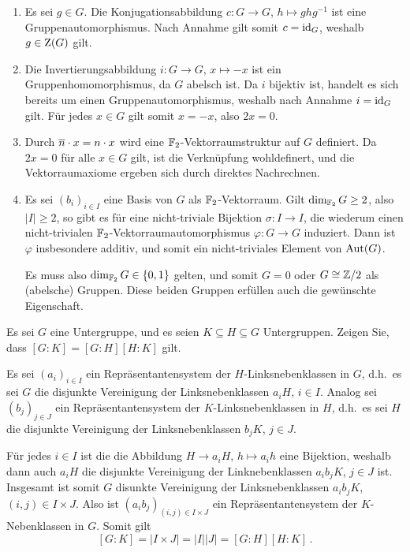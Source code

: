 \begin{solution}
  \begin{enumerate}
    \item
      Es sei $g \in G$.
      Die Konjugationsabbildung $c \colon G \to G$, $h \mapsto ghg^{-1}$ ist eine Gruppenautomorphismus.
      Nach Annahme gilt somit $c = \operatorname{id}_G$, weshalb $g \in \operatorname{Z}(G)$ gilt.
    \item
      Die Invertierungsabbildung $i \colon G \to G$, $x \mapsto -x$ ist ein Gruppenhomomorphismus, da $G$ abelsch ist.
      Da $i$ bijektiv ist, handelt es sich bereits um einen Gruppenautomorphismus, weshalb nach Annahme $i = \operatorname{id}_G$ gilt.
      Für jedes $x \in G$ gilt somit $x = -x$, also $2x = 0$.
    \item
      Durch $\overline{n} \cdot x = n \cdot x$ wird eine $\mathbb{F}_2$-Vektorraumstruktur auf $G$ definiert.
      Da $2x = 0$ für alle $x \in G$ gilt, ist die Verknüpfung wohldefinert, und die Vektorraumaxiome ergeben sich durch direktes Nachrechnen.
    \item
      Es sei $(b_i)_{i \in I}$ eine Basis von $G$ als $\mathbb{F}_2$-Vektorraum.
      Gilt $\dim_{\mathbb{F}_2} G \geq 2$, also $|I| \geq 2$, so gibt es für eine nicht-triviale Bijektion $\sigma \colon I \to I$, die wiederum einen nicht-trivialen $\mathbb{F}_2$-Vektorraumautomorphismus $\varphi \colon G \to G$ induziert.
      Dann ist $\varphi$ insbesondere additiv, und somit ein nicht-triviales Element von $\operatorname{Aut}(G)$.
      
      Es muss also $\dim_{\mathbb{F}_2} G \in \{0, 1\}$ gelten, und somit $G = 0$ oder $G \cong \mathbb{Z}/2$ als (abelsche) Gruppen.
      Diese beiden Gruppen erfüllen auch die gewünschte Eigenschaft.
  \end{enumerate}
\end{solution}


\begin{question}[subtitle = Multiplikativität des Index]
  Es sei $G$ eine Untergruppe, und es seien $K \subseteq H \subseteq G$ Untergruppen.
  Zeigen Sie, dass $[G : K] = [G : H][H : K]$ gilt.
\end{question}


\begin{solution}
  Es sei $(a_i)_{i \in I}$ ein Repräsentantensystem der $H$-Linksnebenklassen in $G$, d.h.\ es sei $G$ die disjunkte Vereinigung der Linksnebenklassen $a_i H$, $i \in I$.
  Analog sei $(b_j)_{j \in J}$ ein Repräsentantensystem der $K$-Linksnebenklassen in $H$, d.h.\ es sei $H$ die disjunkte Vereinigung der Linksnebenklassen $b_j K$, $j \in J$.
  
  Für jedes $i \in I$ ist die die Abbildung $H \to a_i H$, $h \mapsto a_i h$ eine Bijektion, weshalb dann auch $a_i H$ die disjunkte Vereinigung der Linknebenklassen $a_i b_j K$, $j \in J$ ist.
  Insgesamt ist somit $G$ disunkte Vereinigung der Linksnebenklassen $a_i b_j K$, $(i,j) \in I \times J$.
  Also ist $(a_i b_j)_{(i,j) \in I \times J}$ ein Repräsentantensystem der $K$-Nebenklassen in $G$.
  Somit gilt
  \[
      [G : K]
    = |I \times J|
    = |I| |J|
    = [G : H] [H : K] \,.
  \]
\end{solution}


